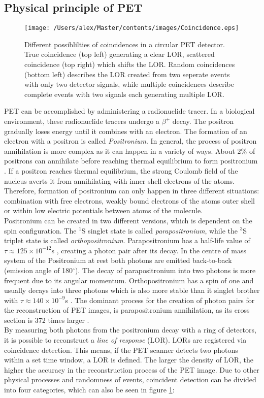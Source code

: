 \subsection{Physical principle of PET}
\begin{figure}[htp]
\centering
\texttt{[image: /Users/alex/Master/contents/images/Coincidence.eps]}
\vspace{1cm}
\caption{Different possiblilties of coincidences in a circular PET detector. True coincidence (top left) generating a clear LOR, scattered coincidence (top right) which shifts the LOR. Random coincidences (bottom left) describes the LOR created from two seperate events with only two detector signals, while multiple coincidences describe complete events with two signals each generating multiple LOR.}
\label{fig:coincidence}
\end{figure}
PET can be accomplished by administering a radionuclide tracer. In a biological environment, these radionuclide tracers undergo a $\beta^+$ decay. The positron gradually loses energy until it combines with an electron. The formation of an electron with a positron is called \textit{Positronium}. In general, the process of positron annihilation is more complex as it can happen in a variety of ways. About 2\% of positrons can annihilate before reaching thermal equilibrium to form positronium \cite{Heitler}. If a positron reaches thermal equilibrium, the strong Coulomb field of the nucleus averts it from annihilating with inner shell electrons of the atoms. Therefore, formation of positronium can only happen in three different situations: combination with free electrons, weakly bound electrons of the atoms outer shell or within low electric potentials between atoms of the molecule.\\Positronium can be created in two different versions, which is dependent on the spin configuration. The $^1$S singlet state is called \textit{parapositronium}, while the $^3$S triplet state is called \textit{orthopositronium}. Parapositronium has a half-life value of $\tau  \approx 125 \times 10^{-12}$s \cite{PDG}, creating a photon pair after its decay. In the centre of mass system of the Positronium at rest both photons are emitted back-to-back (emission angle of 180$^\circ$). The decay of parapositronium into two photons is more frequent due to its angular momentum. Orthopositronium has a spin of one and usually decays into three photons which is also more stable than it singlet brother with $\tau  \approx 140 \times 10^{-9}$s \cite{PDG}. The dominant process for the creation of photon pairs for the reconstruction of PET images, is parapositronium annihilation, as its cross section is 372 times larger \cite{Musiol}.\\By measuring both photons from the positronium decay with a ring of detectors, it is possible to reconstruct a \textit{line of response} (LOR). LORs are registered via coincidence detection. This means, if the PET scanner detects two photons within a set time window, a LOR is defined. The larger the density of LOR, the higher the accuracy in the reconstruction process of the PET image. Due to other physical processes and randomness of events, coincident detection can be divided into four categories, which can also be seen in figure \ref{fig:coincidence}:
